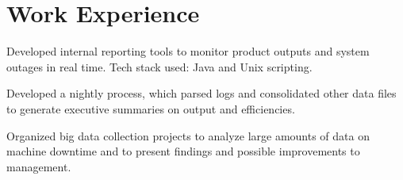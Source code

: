 \documentclass[]{deedy-resume-openfont}
\begin{document}
\begin{minipage}[t]{0.61\textwidth}
\iffalse
\runsubsection{Aircraft Avionics}
\descript{| AME-E}
\begin{tightemize} 
\item Work experience accreditation from Transport Canada.
\item Knowledge of Canadian Aviation Regulations (CARs).
\item Performed maintenance tasks on various jet aircraft including Boeing 737 and Bombardier CRJ200.
\item Performed bench testing of various electrical components.
\item Installed NAVCOM system on Bell 206A Helicopter
\item Created electrical wiring harnesses and routed it through aircraft.
\item Performed bench and operational testing on various VHF and UHF COM/NAV and GPS TX and RX.
\item Conducted all installations and tests IAW A/C electrical wiring diagrams and mechanical system schematics using various AMMs and CMMs.
\
\end{tightemize}
\sectionsep
\fi



\section{Work Experience}

{}
\begin{tightemize} 
\item Developed internal reporting tools to monitor product outputs and system outages in real time. Tech stack used: Java and Unix scripting.
\item Developed a nightly process, which parsed logs and consolidated other data files to generate executive summaries on output and efficiencies.
\item Organized big data collection projects to analyze large amounts of data on machine downtime and to present findings and possible improvements to management.
\end{tightemize}
\sectionsep


\end{minipage}
\end{document}
